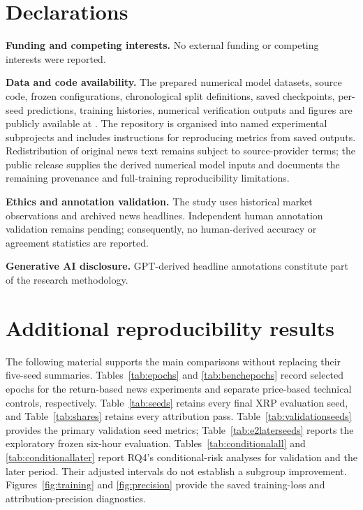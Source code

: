 \section*{Declarations}
\begingroup\small

\noindent\textbf{Funding and competing interests.}
No external funding or competing interests
were reported.

\par\noindent\textbf{Data and code availability.}
The prepared numerical model datasets, source code, frozen configurations, chronological split definitions, saved checkpoints, per-seed predictions, training histories, numerical verification outputs and figures are publicly available at \ResearchRepository. The repository is organised into named experimental subprojects and includes instructions for reproducing metrics from saved outputs. Redistribution of original news text remains subject to source-provider terms; the public release supplies the derived numerical model inputs and documents the remaining provenance and full-training reproducibility limitations.

\par\noindent\textbf{Ethics and annotation validation.}
The study uses historical market
observations and archived news headlines.
Independent human annotation validation
remains pending; consequently, no
human-derived accuracy or agreement
statistics are reported.

\par\noindent\textbf{Generative AI disclosure.}
GPT-derived headline annotations
constitute part of the research
methodology. 


\endgroup

\FloatBarrier
\appendix
\section{Additional reproducibility results}\label{app:additional}
The following material supports the main comparisons without replacing their five-seed summaries. Tables~\ref{tab:epochs} and \ref{tab:benchepochs} record selected epochs for the return-based news experiments and separate price-based technical controls, respectively. Table~\ref{tab:seeds} retains every final XRP evaluation seed, and Table~\ref{tab:shares} retains every attribution pass. Table~\ref{tab:validationseeds} provides the primary validation seed metrics; Table~\ref{tab:e2laterseeds} reports the exploratory frozen six-hour evaluation. Tables~\ref{tab:conditionalall} and \ref{tab:conditionallater} report RQ4's conditional-risk analyses for validation and the later period. Their adjusted intervals do not establish a subgroup improvement. Figures~\ref{fig:training} and \ref{fig:precision} provide the saved training-loss and attribution-precision diagnostics.

